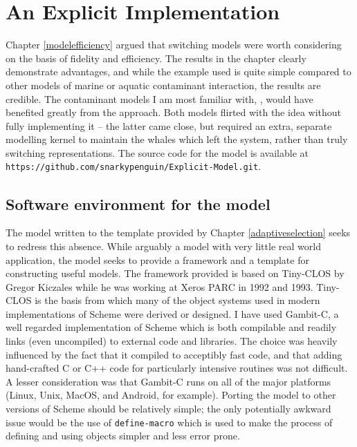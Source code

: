 

\chapter[An Explicit Implementation]{An Explicit Implementation}
\WeAreOn{\cfive}\label{explicitmodel}

Chapter \ref{modelefficiency} argued that switching models were worth
considering on the basis of fidelity and efficiency. The results in
the chapter clearly demonstrate advantages, and while the example used
is quite simple compared to other models of marine or aquatic
contaminant interaction, the results are credible.  The contaminant
models I am most familiar with, \cite{Gray2006nws, Gray2014}, would
have benefited greatly from the approach. Both models flirted with the
idea without fully implementing it -- the latter came close, but
required an extra,  separate modelling kernel to maintain the whales
which left the system, rather than truly switching representations.
The source code for the model is available at \linebreak
\texttt{https://github.com/snarkypenguin/Explicit-Model.git}.

\section{Software environment for the model}
The model written to the template provided by
Chapter \ref{adaptiveselection} seeks to redress this absence.  While
arguably a model with very little real world application, the model
seeks to provide a framework and a template for constructing useful
models. The framework provided is based on Tiny-CLOS by Gregor
Kiczales while he was working at Xeros PARC in 1992 and 1993.
Tiny-CLOS is the basis from which many of the object systems used in modern
implementations of Scheme were derived or designed.  I have used
Gambit-C, a well regarded implementation of Scheme which is both
compilable and readily links (even uncompiled) to external code and
libraries. The choice was heavily influenced by the fact that it
compiled to acceptibly fast code, and that adding hand-crafted C or
C++ code for particularly intensive routines was not difficult.  
A lesser consideration was that Gambit-C runs on all of the major
platforms (Linux, Unix, MacOS, and Android, for example).
Porting the model to other versions of Scheme should be relatively
simple; the only potentially awkward issue would be the use
of \texttt{define-macro} which is used to make the process of defining
and using objects simpler and less error prone.

